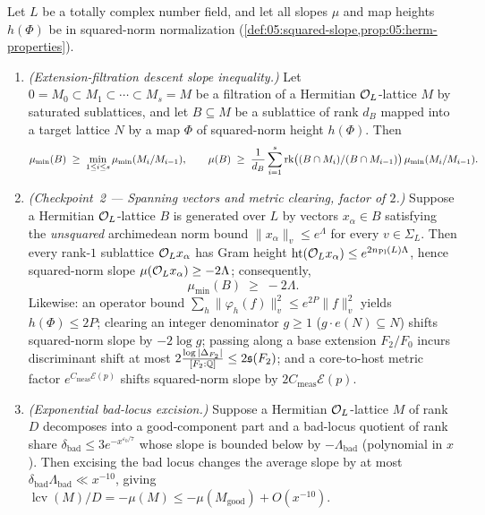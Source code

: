 \begin{proposition}
\label{prop:14:descent-toolkit}
Let $L$ be a totally complex number field, and let all slopes $\mu$ and map heights $h(\Phi)$ be in squared-norm normalization (\cref{def:05:squared-slope,prop:05:herm-properties}).
\begin{enumerate}[label=\textup{(\roman*)}]
\item \emph{(Extension-filtration descent slope inequality.)} Let $0 = M_0 \subset M_1 \subset \cdots \subset M_s = M$ be a filtration of a Hermitian $\mathcal{O}_L$-lattice $M$ by saturated sublattices, and let $B \subseteq M$ be a sublattice of rank $d_B$ mapped into a target lattice $N$ by a map $\Phi$ of squared-norm height $h(\Phi)$. Then
  \begin{equation}
  \label{eq:14:descent-slope}
    \mu_{\min}(B) \;\ge\; \min_{1 \le i \le s} \mu_{\min}(M_i / M_{i-1}),
    \qquad
    \mu(B) \;\ge\; \frac{1}{d_B}\sum_{i=1}^s \operatorname{rk}\bigl((B \cap M_i)/(B \cap M_{i-1})\bigr)\,\mu_{\min}(M_i / M_{i-1}).
  \end{equation}
\item \emph{(Checkpoint~2 — Spanning vectors and metric clearing, factor of $2$.)}
  Suppose a Hermitian $\mathcal{O}_L$-lattice $B$ is generated over $L$ by vectors $x_\alpha \in B$ satisfying the \emph{unsquared} archimedean norm bound $\|x_\alpha\|_v \le e^{\Lambda}$ for every $v \in \Sigma_L$. Then every rank-$1$ sublattice $\mathcal{O}_L x_\alpha$ has Gram height $\operatorname{ht}(\mathcal{O}_L x_\alpha) \le e^{2 n_{\mathrm{Pl}}(L)\Lambda}$, hence squared-norm slope $\mu(\mathcal{O}_L x_\alpha) \ge -2\Lambda$; consequently,
  \begin{equation}
  \label{eq:14:span-mumin}
    \mu_{\min}(B) \;\ge\; -2\Lambda.
  \end{equation}
  Likewise: an operator bound $\sum_h \|\varphi_h(f)\|_v^2 \le e^{2P}\|f\|_v^2$ yields $h(\Phi) \le 2P$; clearing an integer denominator $g \ge 1$ ($g\cdot e(N) \subseteq N$) shifts squared-norm slope by $-2\log g$; passing along a base extension $F_2 / F_0$ incurs discriminant shift at most $2\frac{\log|\Delta_{F_2}|}{[F_2:\mathbb{Q}]} \le 2\mathfrak{s}(F_2)$; and a core-to-host metric factor $e^{C_{\mathrm{meas}}\mathcal{E}(p)}$ shifts squared-norm slope by $2 C_{\mathrm{meas}}\mathcal{E}(p)$.
\item \emph{(Exponential bad-locus excision.)} Suppose a Hermitian $\mathcal{O}_L$-lattice $M$ of rank $D$ decomposes into a good-component part and a bad-locus quotient of rank share $\delta_{\mathrm{bad}} \le 3 e^{-x^{\varepsilon_0 / 7}}$ whose slope is bounded below by $-\Lambda_{\mathrm{bad}}$ (polynomial in $x$). Then excising the bad locus changes the average slope by at most $\delta_{\mathrm{bad}}\Lambda_{\mathrm{bad}} \ll x^{-10}$, giving $\operatorname{lcv}(M)/D = -\mu(M) \le -\mu(M_{\mathrm{good}}) + O(x^{-10})$.
\end{enumerate}
\end{proposition}

